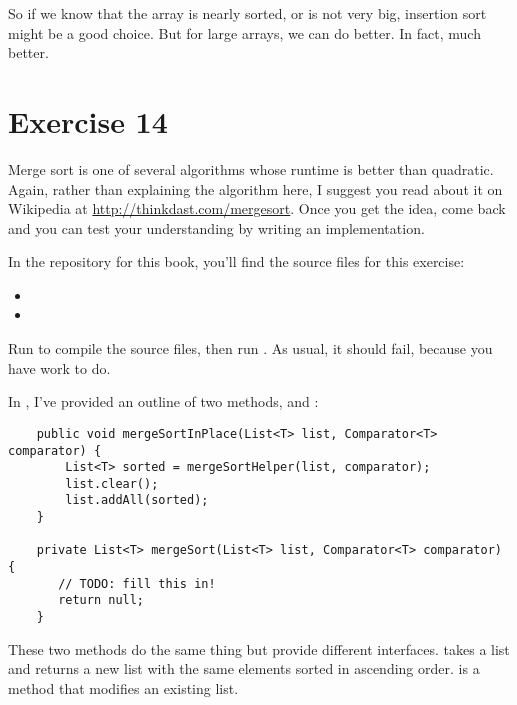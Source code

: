 \documentclass[12pt]{book}
\theoremstyle{exercise}
\begin{document}
So if we know that the array is nearly sorted, or is not very big,
insertion sort might be a good choice. But for large arrays, we can
do better. In fact, much better.


\section{Exercise 14}
\label{exercise14}

Merge sort is one of several algorithms whose runtime is better than
quadratic. Again, rather than explaining the algorithm here, I suggest
you read about it on Wikipedia at
\url{http://thinkdast.com/mergesort}.  Once you get the idea, come
back and you can test your understanding by writing an implementation.


In the repository for this book, you'll find the source files for this
exercise:

\begin{itemize}

\item

\item

\end{itemize}

Run  to compile the source files, then run
. As usual, it should
fail, because you have work to do.


In , I've provided an outline of two methods,
 and :

\begin{verbatim}
    public void mergeSortInPlace(List<T> list, Comparator<T> comparator) {
        List<T> sorted = mergeSortHelper(list, comparator);
        list.clear();
        list.addAll(sorted);
    }

    private List<T> mergeSort(List<T> list, Comparator<T> comparator) {
       // TODO: fill this in!
       return null;
    }
\end{verbatim}

These two methods do the same thing but provide different interfaces.
 takes a list and returns a new list with the same
elements sorted in ascending order.  is a
 method that modifies an existing list.
\end{document}
